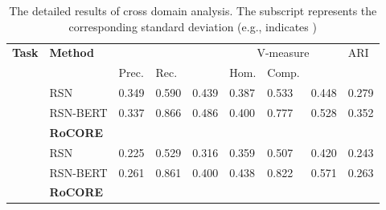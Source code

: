\documentclass[11pt]{article}
\begin{document}
\begin{table*}
            \centering
            \begin{tabular}{ll lll lll l}
            \toprule
            \multirow{2}{*}{\textbf{Task}} & \multirow{2}{*}{\textbf{Method}} & \multicolumn{3}{c}{} & \multicolumn{3}{c}{V-measure} & \multirow{2}{*}{ARI}\\
            \cline{3-8}
            & & Prec. & Rec. &  & Hom. & Comp. & \\
            \midrule
            \multirow{3}{*}{}
            &RSN & 0.349 & 0.590 & 0.439 & 0.387 & 0.533 & 0.448 & 0.279\\
            &RSN-BERT & 0.337 & 0.866 & 0.486 & 0.400 & 0.777 & 0.528 & 0.352\\
            &\textbf{RoCORE} &  &  &  &  &  &  & \\
            \hline \hline
            \multirow{3}{*}{}
            &RSN & 0.225 & 0.529 & 0.316 & 0.359 & 0.507 & 0.420 & 0.243 \\
            &RSN-BERT & 0.261 & 0.861 & 0.400 & 0.438 & 0.822 & 0.571 & 0.263\\
            &\textbf{RoCORE}&  &  &  &  &  &  & \\
            \bottomrule
            \end{tabular}
            \caption{
            The detailed results of cross domain analysis. The subscript represents the corresponding standard deviation (e.g.,  indicates )
            }
            \label{tab:det_cro}
        \end{table*}   
\end{document}
